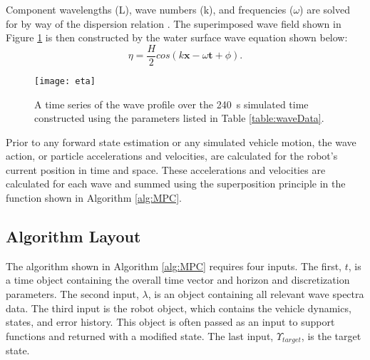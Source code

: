 \documentclass[letterpaper, 10pt, conference]{IEEEtran}
\renewcommand{\vec}[1]{\mathbf{#1}}
\begin{document}
Component wavelengths (L), wave numbers (k), and frequencies ($\omega$) are solved for by way of the dispersion relation \cite{D&D}. The superimposed wave field shown in Figure \ref{fig:eta} is then constructed by the water surface wave equation shown below:  
\begin{equation} 
\eta = \frac{H}{2}cos(k\vec{x}-\omega\vec{t}+\phi) .
\label{eqn9}
\end{equation}

\begin{figure}
\texttt{[image: eta]}
\vspace*{-14pt}
\centering
\caption{A time series of the wave profile over the 240~s simulated time constructed using the parameters listed in Table \ref{table:waveData}.}
\label{fig:eta}
\end{figure}

Prior to any forward state estimation or any simulated vehicle motion, the wave action, or particle accelerations and velocities, are calculated for the robot's current position in time and space. These accelerations and velocities are calculated for each wave and summed using the superposition principle in the function  shown in Algorithm \ref{alg:MPC}.

\subsection{Algorithm Layout}

The  algorithm shown in Algorithm \ref{alg:MPC} requires four inputs. The first, $t$, is a time object containing the overall time vector and horizon and discretization parameters. The second input, $\lambda$, is an object containing all relevant wave spectra data. The third input is the robot object, which contains the vehicle dynamics, states, and error history. This object is often passed as an input to support functions and returned with a modified state. The last input, $\Upsilon_{target}$, is the target state.
\end{document}
